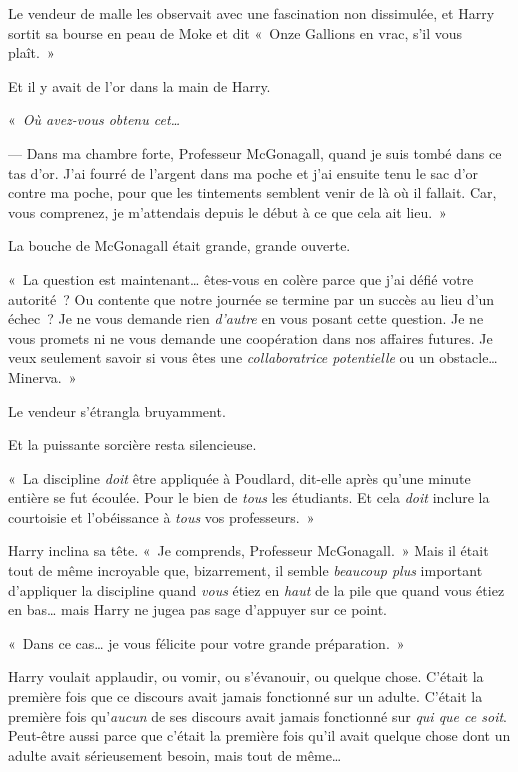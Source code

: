 Le vendeur de malle les observait avec une fascination non dissimulée, et Harry sortit sa bourse en peau de Moke et dit «~Onze Gallions en vrac, s'il vous plaît.~»

Et il y avait de l'or dans la main de Harry.

«~\emph{Où avez-vous obtenu cet…}

--- Dans ma chambre forte, Professeur McGonagall, quand je suis tombé dans ce tas d'or. J'ai fourré de l'argent dans ma poche et j'ai ensuite tenu le sac d'or contre ma poche, pour que les tintements semblent venir de là où il fallait. Car, vous comprenez, je m'attendais depuis le début à ce que cela ait lieu.~»

La bouche de McGonagall était grande, grande ouverte.

«~La question est maintenant… êtes-vous en colère parce que j'ai défié votre autorité~? Ou contente que notre journée se termine par un succès au lieu d'un échec~? Je ne vous demande rien \emph{d'autre} en vous posant cette question. Je ne vous promets ni ne vous demande une coopération dans nos affaires futures. Je veux seulement savoir si vous êtes une \emph{collaboratrice potentielle} ou un obstacle… Minerva.~»

Le vendeur s'étrangla bruyamment.

Et la puissante sorcière resta silencieuse.

«~La discipline \emph{doit} être appliquée à Poudlard, dit-elle après qu'une minute entière se fut écoulée. Pour le bien de \emph{tous} les étudiants. Et cela \emph{doit} inclure la courtoisie et l'obéissance à \emph{tous} vos professeurs.~»

Harry inclina sa tête. «~Je comprends, Professeur McGonagall.~» Mais il était tout de même incroyable que, bizarrement, il semble \emph{beaucoup plus} important d'appliquer la discipline quand \emph{vous} étiez en \emph{haut} de la pile que quand vous étiez en bas… mais Harry ne jugea pas sage d'appuyer sur ce point.

«~Dans ce cas… je vous félicite pour votre grande préparation.~»

Harry voulait applaudir, ou vomir, ou s'évanouir, ou quelque chose. C'était la première fois que ce discours avait jamais fonctionné sur un adulte. C'était la première fois qu'\emph{aucun} de ses discours avait jamais fonctionné sur \emph{qui que ce soit}. Peut-être aussi parce que c'était la première fois qu'il avait quelque chose dont un adulte avait sérieusement besoin, mais tout de même…


